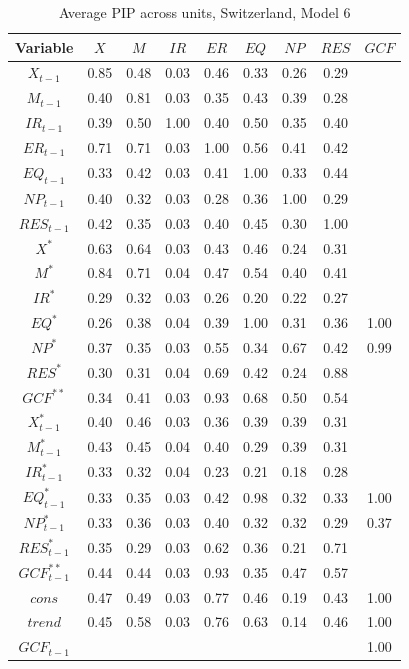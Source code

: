 \documentclass[a4paper, twoside]{templates/ociamthesis}
\begin{document}
\begin{table}[!ht]

\caption{\label{tab:Table55CH6}Average PIP across units, Switzerland, Model 6}
\centering
\fontsize{8}{10}\selectfont
\begin{tabular}[t]{ccccccccc}
\toprule
Variable & $X$ & $M$ & $IR$ & $ER$ & $EQ$ & $NP$ & $RES$ & $GCF$\\
\midrule
$X_{t-1}$ & 0.85 & 0.48 & 0.03 & 0.46 & 0.33 & 0.26 & 0.29 & \\
$M_{t-1}$ & 0.40 & 0.81 & 0.03 & 0.35 & 0.43 & 0.39 & 0.28 & \\
$IR_{t-1}$ & 0.39 & 0.50 & 1.00 & 0.40 & 0.50 & 0.35 & 0.40 & \\
$ER_{t-1}$ & 0.71 & 0.71 & 0.03 & 1.00 & 0.56 & 0.41 & 0.42 & \\
$EQ_{t-1}$ & 0.33 & 0.42 & 0.03 & 0.41 & 1.00 & 0.33 & 0.44 & \\
$NP_{t-1}$ & 0.40 & 0.32 & 0.03 & 0.28 & 0.36 & 1.00 & 0.29 & \\
$RES_{t-1}$ & 0.42 & 0.35 & 0.03 & 0.40 & 0.45 & 0.30 & 1.00 & \\
$X^*$ & 0.63 & 0.64 & 0.03 & 0.43 & 0.46 & 0.24 & 0.31 & \\
$M^*$ & 0.84 & 0.71 & 0.04 & 0.47 & 0.54 & 0.40 & 0.41 & \\
$IR^*$ & 0.29 & 0.32 & 0.03 & 0.26 & 0.20 & 0.22 & 0.27 & \\
$EQ^*$ & 0.26 & 0.38 & 0.04 & 0.39 & 1.00 & 0.31 & 0.36 & 1.00\\
$NP^*$ & 0.37 & 0.35 & 0.03 & 0.55 & 0.34 & 0.67 & 0.42 & 0.99\\
$RES^*$ & 0.30 & 0.31 & 0.04 & 0.69 & 0.42 & 0.24 & 0.88 & \\
$GCF^{**}$ & 0.34 & 0.41 & 0.03 & 0.93 & 0.68 & 0.50 & 0.54 & \\
$X^*_{t-1}$ & 0.40 & 0.46 & 0.03 & 0.36 & 0.39 & 0.39 & 0.31 & \\
$M^*_{t-1}$ & 0.43 & 0.45 & 0.04 & 0.40 & 0.29 & 0.39 & 0.31 & \\
$IR^*_{t-1}$ & 0.33 & 0.32 & 0.04 & 0.23 & 0.21 & 0.18 & 0.28 & \\
$EQ^*_{t-1}$ & 0.33 & 0.35 & 0.03 & 0.42 & 0.98 & 0.32 & 0.33 & 1.00\\
$NP^*_{t-1}$ & 0.33 & 0.36 & 0.03 & 0.40 & 0.32 & 0.32 & 0.29 & 0.37\\
$RES^*_{t-1}$ & 0.35 & 0.29 & 0.03 & 0.62 & 0.36 & 0.21 & 0.71 & \\
$GCF^{**}_{t-1}$ & 0.44 & 0.44 & 0.03 & 0.93 & 0.35 & 0.47 & 0.57 & \\
$cons$ & 0.47 & 0.49 & 0.03 & 0.77 & 0.46 & 0.19 & 0.43 & 1.00\\
$trend$ & 0.45 & 0.58 & 0.03 & 0.76 & 0.63 & 0.14 & 0.46 & 1.00\\
$GCF_{t-1}$ &  &  &  &  &  &  &  & 1.00\\
\bottomrule
\end{tabular}
\end{table}
\end{document}
